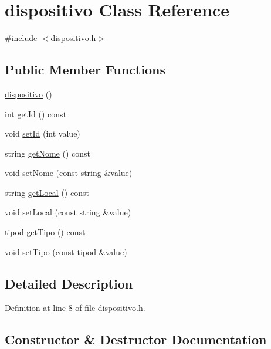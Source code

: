 \hypertarget{classdispositivo}{}\section{dispositivo Class Reference}
\label{classdispositivo}


{\ttfamily \#include $<$dispositivo.\+h$>$}

\subsection*{Public Member Functions}
\begin{DoxyCompactItemize}
\item 
\hyperlink{classdispositivo_aa6a6c3140271f71ff41cec06b7296e66}{dispositivo} ()
\item 
int \hyperlink{classdispositivo_a067622c9fc2f0fc431f59593dd083848}{get\+Id} () const
\item 
void \hyperlink{classdispositivo_a1cf6775652391e4ace63b9613295faa6}{set\+Id} (int value)
\item 
string \hyperlink{classdispositivo_a1157605bedafd71756b5cfcb7fced335}{get\+Nome} () const
\item 
void \hyperlink{classdispositivo_a1d57090d304269e4fc75695bcdce1d30}{set\+Nome} (const string \&value)
\item 
string \hyperlink{classdispositivo_a0847829a4ec7d11882f1bd55e0849672}{get\+Local} () const
\item 
void \hyperlink{classdispositivo_aea13deb655b82642c809d925d1460926}{set\+Local} (const string \&value)
\item 
\hyperlink{classtipod}{tipod} \hyperlink{classdispositivo_a8fc01fa7c51737dd1995fd63d3fcd0d2}{get\+Tipo} () const
\item 
void \hyperlink{classdispositivo_a4789a0c9d01d1a80eb1e947044a72fd7}{set\+Tipo} (const \hyperlink{classtipod}{tipod} \&value)
\end{DoxyCompactItemize}


\subsection{Detailed Description}


Definition at line 8 of file dispositivo.\+h.



\subsection{Constructor \& Destructor Documentation}
\hypertarget{classdispositivo_aa6a6c3140271f71ff41cec06b7296e66}{}\label{classdispositivo_aa6a6c3140271f71ff41cec06b7296e66} 
